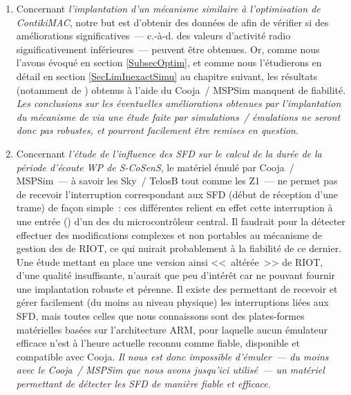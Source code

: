 \begin{enumerate}

\item Concernant \emph{l'implantation d'un mécanisme similaire à
l'optimisation  de ContikiMAC}, notre but est
d'obtenir des données de  afin de vérifier si des
améliorations significatives~--- c.-à-d. des valeurs d'activité radio
significativement inférieures~--- peuvent être obtenues. Or, comme nous
l'avons évoqué en section \vref{SubsecOptim}, et comme nous l'étudierons
en détail en section \ref{SecLimInexactSimu} au chapitre suivant, les
résultats (notamment de ) obtenus à l'aide du
 Cooja~/ MSPSim manquent de fiabilité.
\emph{Les conclusions sur les éventuelles améliorations obtenues par
l'implantation du mécanisme de  via une étude faite
par simulations~/ émulations ne seront donc pas robustes, et pourront
facilement être remises en question}.

\item Concernant \emph{l'étude de l'influence des SFD sur le calcul de la
durée de la période d'écoute WP de S-CoSenS}, le matériel émulé par Cooja~/
MSPSim~--- à savoir les  Sky~/ TelosB tout comme les Z1~---
ne permet pas de recevoir l'interruption correspondant aux SFD (début de
réception d'une trame) de façon simple~: ces différentes 
relient en effet cette interruption à une entrée () d'un
des  du microcontrôleur central. Il faudrait pour la détecter
effectuer des modifications complexes et non portables au mécanisme de
gestion des  de RIOT, ce qui nuirait probablement à la
fiabilité de ce dernier. Une étude mettant en place une version ainsi
<<~altérée~>> de RIOT, d'une qualité insuffisante, n'aurait que peu
d'intérêt car ne pouvant fournir une implantation robuste et pérenne.
Il existe des  permettant de recevoir et gérer facilement
(du moins au niveau physique) les interruptions liées aux SFD, mais toutes
celles que nous connaissons sont des plates-formes matérielles basées sur
l'architecture ARM, pour laquelle aucun émulateur efficace n'est à l'heure
actuelle reconnu comme fiable, disponible et compatible avec Cooja.
\emph{Il nous est donc impossible d'émuler~--- du moins avec le
 Cooja~/ MSPSim que nous avons jusqu'ici utilisé~---
un matériel permettant de détecter les SFD de manière fiable et efficace.}


\end{enumerate}
